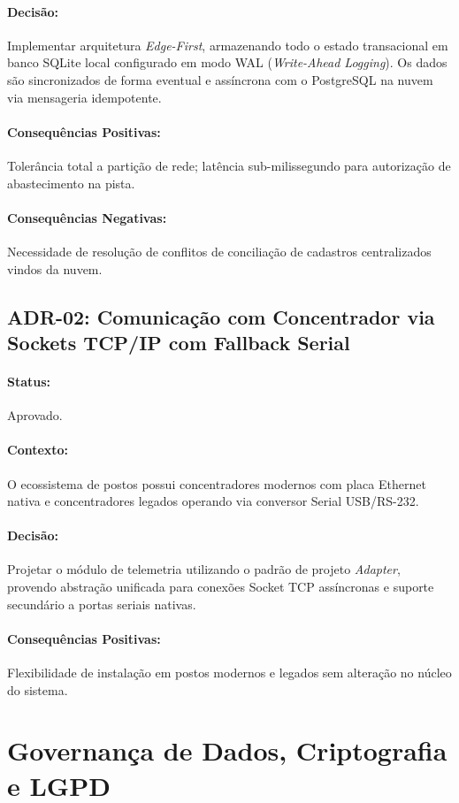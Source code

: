 \paragraph{Decisão:} Implementar arquitetura \textit{Edge-First}, armazenando todo o estado transacional em banco SQLite local configurado em modo WAL (\textit{Write-Ahead Logging}). Os dados são sincronizados de forma eventual e assíncrona com o PostgreSQL na nuvem via mensageria idempotente.
\paragraph{Consequências Positivas:} Tolerância total a partição de rede; latência sub-milissegundo para autorização de abastecimento na pista.
\paragraph{Consequências Negativas:} Necessidade de resolução de conflitos de conciliação de cadastros centralizados vindos da nuvem.

\subsection{ADR-02: Comunicação com Concentrador via Sockets TCP/IP com Fallback Serial}
\paragraph{Status:} Aprovado.
\paragraph{Contexto:} O ecossistema de postos possui concentradores modernos com placa Ethernet nativa e concentradores legados operando via conversor Serial USB/RS-232.
\paragraph{Decisão:} Projetar o módulo de telemetria utilizando o padrão de projeto \textit{Adapter}, provendo abstração unificada para conexões Socket TCP assíncronas e suporte secundário a portas seriais nativas.
\paragraph{Consequências Positivas:} Flexibilidade de instalação em postos modernos e legados sem alteração no núcleo do sistema.

\section{Governança de Dados, Criptografia e LGPD}

